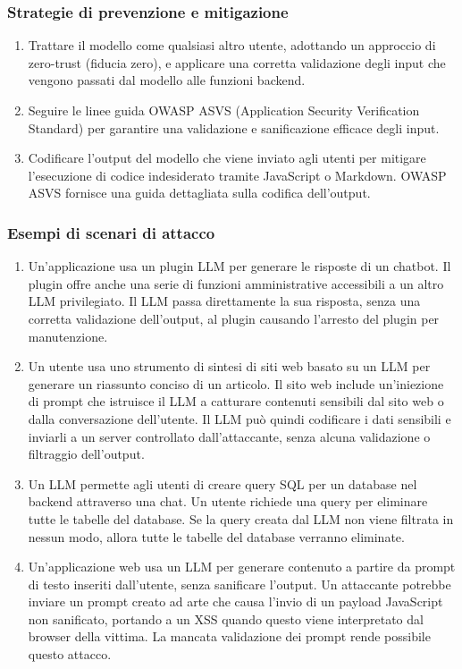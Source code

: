 \documentclass[
]{article}
\providecommand{\tightlist}{%
  \setlength{\itemsep}{0pt}\setlength{\parskip}{0pt}}
\begin{document}
\subsubsection{Strategie di prevenzione e
mitigazione}\label{strategie-di-prevenzione-e-mitigazione}

\begin{enumerate}
\def\labelenumi{\arabic{enumi}.}
\tightlist
\item
  Trattare il modello come qualsiasi altro utente, adottando un
  approccio di zero-trust (fiducia zero), e applicare una corretta
  validazione degli input che vengono passati dal modello alle funzioni
  backend.
\item
  Seguire le linee guida OWASP ASVS (Application Security Verification
  Standard) per garantire una validazione e sanificazione efficace degli
  input.
\item
  Codificare l'output del modello che viene inviato agli utenti per
  mitigare l'esecuzione di codice indesiderato tramite JavaScript o
  Markdown. OWASP ASVS fornisce una guida dettagliata sulla codifica
  dell'output.
\end{enumerate}

\subsubsection{Esempi di scenari di
attacco}\label{esempi-di-scenari-di-attacco}

\begin{enumerate}
\def\labelenumi{\arabic{enumi}.}
\tightlist
\item
  Un'applicazione usa un plugin LLM per generare le risposte di un
  chatbot. Il plugin offre anche una serie di funzioni amministrative
  accessibili a un altro LLM privilegiato. Il LLM passa direttamente la
  sua risposta, senza una corretta validazione dell'output, al plugin
  causando l'arresto del plugin per manutenzione.
\item
  Un utente usa uno strumento di sintesi di siti web basato su un LLM
  per generare un riassunto conciso di un articolo. Il sito web include
  un'iniezione di prompt che istruisce il LLM a catturare contenuti
  sensibili dal sito web o dalla conversazione dell'utente. Il LLM può
  quindi codificare i dati sensibili e inviarli a un server controllato
  dall'attaccante, senza alcuna validazione o filtraggio dell'output.
\item
  Un LLM permette agli utenti di creare query SQL per un database nel
  backend attraverso una chat. Un utente richiede una query per
  eliminare tutte le tabelle del database. Se la query creata dal LLM
  non viene filtrata in nessun modo, allora tutte le tabelle del
  database verranno eliminate.
\item
  Un'applicazione web usa un LLM per generare contenuto a partire da
  prompt di testo inseriti dall'utente, senza sanificare l'output. Un
  attaccante potrebbe inviare un prompt creato ad arte che causa l'invio
  di un payload JavaScript non sanificato, portando a un XSS quando
  questo viene interpretato dal browser della vittima. La mancata
  validazione dei prompt rende possibile questo attacco.
\end{enumerate}
\end{document}
